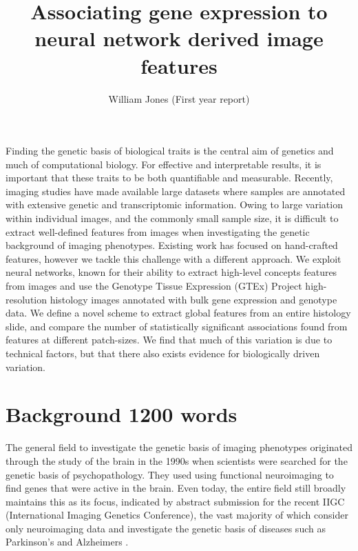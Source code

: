 \documentclass[graybox]{svmult}
\begin{document}
\title*{Associating gene expression to neural network derived image features}
\author{William Jones (First year report)}
%
%
\maketitle



{Finding the genetic basis of biological traits is the central aim of genetics and much of computational biology. For effective and interpretable results, it is important that these traits to be both quantifiable and measurable. Recently, imaging studies have made available large datasets where samples are annotated with extensive genetic and transcriptomic information. Owing to large variation within individual images, and the commonly small sample size, it is difficult to extract well-defined features from images when investigating the genetic background of imaging phenotypes. Existing work has focused on hand-crafted features, however we tackle this challenge with a different approach. We exploit neural networks, known for their ability to extract high-level concepts features from images and use the Genotype Tissue Expression (GTEx) Project high-resolution histology images annotated with bulk gene expression and genotype data. We define a novel scheme to extract global features from an entire histology slide, and compare the number of statistically significant associations found from features at different patch-sizes. We find that much of this variation is due to technical factors, but that there also exists evidence for biologically driven variation.}

\section{Background 1200 words}

The general field to investigate the genetic basis of imaging phenotypes originated through the study of the brain in the 1990s \cite{imaging-as-a-tool} \cite{imaging-genetics} when scientists were searched for the genetic basis of psychopathology. They used using functional neuroimaging to find genes that were active in the brain. Even today, the entire field still broadly maintains this as its focus, indicated by abstract submission for the recent IIGC (International Imaging Genetics Conference), the vast majority of which consider only neuroimaging data and investigate the genetic basis of diseases such as Parkinson's and Alzheimers \cite{imaging-genetics-parkinsons}.
\end{document}
